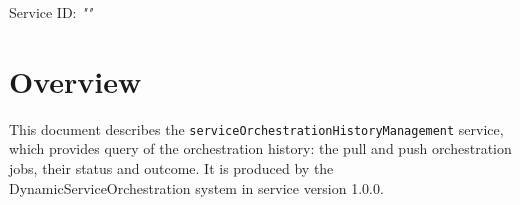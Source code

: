 \documentclass[a4paper]{arrowhead}
\begin{document}
\sloppy

\ArrowheadSetup

\begin{center}
  \vspace*{1cm}
  \huge{\arrowtitle}

  \vspace*{0.2cm}
  \LARGE{\arrowtype}
  \vspace*{1cm}

  \Large{Service ID: \textit{"\arrowid"}}

  \vspace*{\fill}


  \vspace*{1cm}
  \vspace*{\fill}

  \begin{abstract}
    This document describes the \texttt{service\allowbreak{}Orchestration\allowbreak{}History\allowbreak{}Management} service, version 1.0.0, produced by the DynamicServiceOrchestration core system of Arrowhead 5.2.2.
  \end{abstract}

  \vspace*{1cm}
\end{center}

\newpage

\tableofcontents
\newpage

\section{Overview}
\label{sec:overview}

This document describes the \texttt{service\allowbreak{}Orchestration\allowbreak{}History\allowbreak{}Management} service, which provides query of the orchestration history: the pull and push orchestration jobs, their status and outcome.
It is produced by the DynamicServiceOrchestration system \cite{dso-sysd} in service version 1.0.0.
\end{document}
